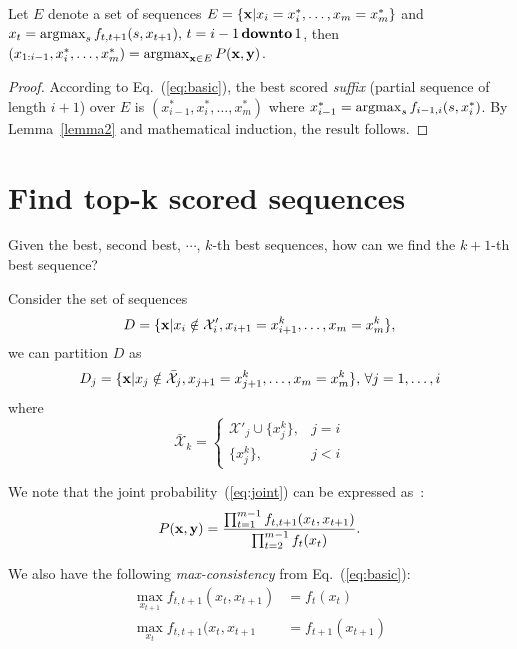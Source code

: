 \begin{theorem}
\label{theorem2}
Let $E$ denote a set of sequences $E = \{\mathbf{x} |x_i = x_i^*, \dots, x_m = x_m^*\}$ and
$x_t = \operatorname*{argmax}_{s} f_{t, t+1}(s, x_{t+1}), \, t = i-1 \,\textbf{downto}\, 1$, 
then $(x_{1:i-1},x_i^*,\dots,x_m^*) = \operatorname*{argmax}_{\mathbf{x} \in E} P(\mathbf{x},\mathbf{y})$.
\end{theorem}

\begin{proof}
According to Eq.~(\ref{eq:basic}), the best scored \emph{suffix} (partial sequence of length $i+1$) over $E$ is $(x_{i-1}^*,x_i^*,\dots,x_m^*)$
where $x_{i-1}^* = \operatorname*{argmax}_{s} f_{i-1, i}(s, x_i^*)$.
By Lemma~\ref{lemma2} and mathematical induction, the result follows.
\end{proof}


\section{Find top-k scored sequences}
\label{sec:topk}

Given the best, second best, $\cdots$, $k$-th best sequences, how can we find the $k\!+\!1$-th best sequence?

Consider the set of sequences 
\begin{equation}
\label{eq:d}
D = \{\mathbf{x} |x_i \notin \mathcal{X}'_i, x_{i+1} = x_{i+1}^k, \dots, x_m = x_m^k\},
\end{equation}
we can partition $D$ as 
\begin{equation}
\label{eq:dj}
D_j = \{\mathbf{x} |x_j \notin \bar{\mathcal{X}}_j, x_{j+1} = x_{j+1}^k, \dots, x_m = x_m^k \}, \, \forall j=1,\dots,i
\end{equation}
where 
\begin{equation*}
\bar{\mathcal{X}}_k = \begin{cases}
                       \mathcal{X}'_j \cup \{x_j^k\}, & j = i \\
                       \{x_j^k \}, & j < i
                      \end{cases}
\end{equation*}

We note that the joint probability~(\ref{eq:joint}) can be expressed as~\cite{nilsson2001sequentially}:
\begin{equation}
P(\mathbf{x}, \mathbf{y}) = \frac{\prod_{t=1}^{m-1} f_{t,t+1}(x_t, x_{t+1})} {\prod_{t=2}^{m-1} f_t(x_t)}.
\end{equation}

We also have the following \emph{max-consistency} from Eq.~(\ref{eq:basic}):
\begin{align}
\label{eq:consistency}
\max_{x_{t+1}} f_{t,t+1}(x_t, x_{t+1}) & = f_t(x_t) \\
\max_{x_t} f_{t,t+1}(x_t, x_{t+1}      & = f_{t+1}(x_{t+1})
\end{align}

